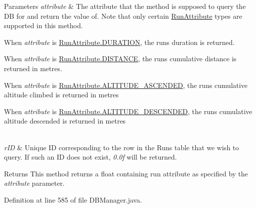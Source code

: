 \begin{DoxyParams}{Parameters}
{\em attribute} & The attribute that the method is supposed to query the DB for and return the value of. Note that only certain \mbox{\hyperlink{enumcom_1_1activitytracker_1_1_run_attribute}{Run\+Attribute}} types are supported in this method.
\begin{DoxyItemize}
\item When {\itshape attribute} is \mbox{\hyperlink{enumcom_1_1activitytracker_1_1_run_attribute_a7adf133b2a62f1f99ffc2adfb7097ec9}{Run\+Attribute.\+D\+U\+R\+A\+T\+I\+ON}}, the run\textquotesingle{}s duration is returned.
\item When {\itshape attribute} is \mbox{\hyperlink{enumcom_1_1activitytracker_1_1_run_attribute_a90ee541e68e458a0bb3f5ea45fd46ec0}{Run\+Attribute.\+D\+I\+S\+T\+A\+N\+CE}}, the run\textquotesingle{}s cumulative distance is returned in metres.
\item When {\itshape attribute} is \mbox{\hyperlink{enumcom_1_1activitytracker_1_1_run_attribute_abcfe85bf48187d67842a0525c1bcc0af}{Run\+Attribute.\+A\+L\+T\+I\+T\+U\+D\+E\+\_\+\+A\+S\+C\+E\+N\+D\+ED}}, the run\textquotesingle{}s cumulative altitude climbed is returned in metres
\item When {\itshape attribute} is \mbox{\hyperlink{enumcom_1_1activitytracker_1_1_run_attribute_a337a68867cfdb8ec7a17c318ad8b216b}{Run\+Attribute.\+A\+L\+T\+I\+T\+U\+D\+E\+\_\+\+D\+E\+S\+C\+E\+N\+D\+ED}}, the run\textquotesingle{}s cumulative altitude descended is returned in metres 
\end{DoxyItemize}\\
\hline
{\em r\+ID} & Unique ID corresponding to the row in the Runs table that we wish to query. If such an ID does not exist, {\itshape 0.\+0f} will be returned.\\
\hline
\end{DoxyParams}
\begin{DoxyReturn}{Returns}
This method returns a float containing run attribute as specified by the {\itshape attribute} parameter. 
\end{DoxyReturn}


Definition at line 585 of file D\+B\+Manager.\+java.


